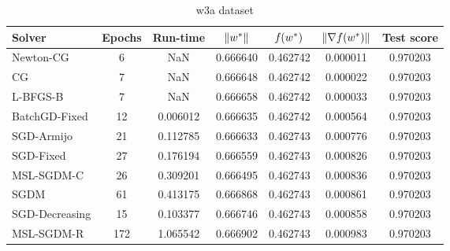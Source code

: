 \begin{table}
\centering
\caption{w3a dataset}
\label{tab:w3a-tab}
\begin{tabular}{lS[drop-zero-decimal]S[round-precision=4]S[round-precision=6]S[round-precision=6]S[exponent-mode=scientific]S[round-precision=6]}
\toprule
Solver & {Epochs} & {Run-time} & {$\lVert w^\ast\rVert$} & {$\operatorname*{\mathit{f}}(w^\ast)$} & {$\lVert\nabla f(w^\ast)\rVert$} & {Test score} \\
\midrule
Newton-CG & 6 & NaN & 0.666640 & 0.462742 & 0.000011 & 0.970203 \\
CG & 7 & NaN & 0.666648 & 0.462742 & 0.000022 & 0.970203 \\
L-BFGS-B & 7 & NaN & 0.666658 & 0.462742 & 0.000033 & 0.970203 \\
BatchGD-Fixed & 12 & 0.006012 & 0.666635 & 0.462742 & 0.000564 & 0.970203 \\
SGD-Armijo & 21 & 0.112785 & 0.666633 & 0.462743 & 0.000776 & 0.970203 \\
SGD-Fixed & 27 & 0.176194 & 0.666559 & 0.462743 & 0.000826 & 0.970203 \\
MSL-SGDM-C & 26 & 0.309201 & 0.666495 & 0.462743 & 0.000836 & 0.970203 \\
SGDM & 61 & 0.413175 & 0.666868 & 0.462743 & 0.000861 & 0.970203 \\
SGD-Decreasing & 15 & 0.103377 & 0.666746 & 0.462743 & 0.000858 & 0.970203 \\
MSL-SGDM-R & 172 & 1.065542 & 0.666902 & 0.462743 & 0.000983 & 0.970203 \\
\bottomrule
\end{tabular}
\end{table}


